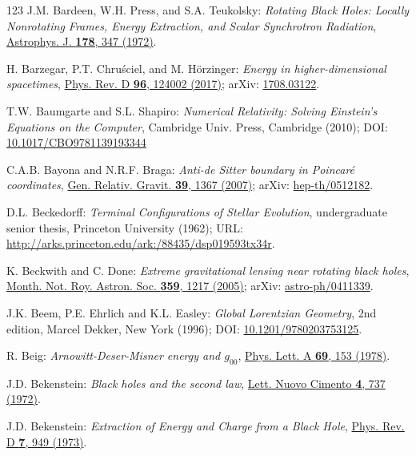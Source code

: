 \begin{thebibliography}{123}
J.M. Bardeen, W.H. Press, and S.A. Teukolsky:
{\em Rotating Black Holes: Locally Nonrotating Frames, Energy Extraction, and Scalar Synchrotron Radiation},
\href{https://doi.org/10.1086/151796}{Astrophys. J. {\bf  178}, 347 (1972)}.

H. Barzegar, P.T. Chruściel, and M. Hörzinger:
{\em Energy in higher-dimensional spacetimes},
\href{https://doi.org/10.1103/PhysRevD.96.124002}{Phys. Rev. D {\bf 96}, 124002 (2017)};
arXiv: \href{https://arxiv.org/abs/1708.03122}{1708.03122}.

T.W. Baumgarte and S.L. Shapiro:
{\em Numerical Relativity: Solving Einstein's Equations on the Computer},
Cambridge Univ. Press, Cambridge (2010);
DOI: \href{https://doi.org/10.1017/CBO9781139193344}{10.1017/CBO9781139193344}

C.A.B. Bayona and N.R.F. Braga:
{\em Anti-de Sitter boundary in Poincaré coordinates},
\href{https://doi.org/10.1007/s10714-007-0446-y}{Gen. Relativ. Gravit. {\bf 39}, 1367 (2007)};
arXiv: \href{https://arxiv.org/abs/hep-th/0512182}{hep-th/0512182}.

D.L. Beckedorff:
{\em Terminal Configurations of Stellar Evolution},
undergraduate senior thesis, Princeton University (1962);
URL: \url{http://arks.princeton.edu/ark:/88435/dsp019593tx34r}.

K. Beckwith and C. Done:
{\em Extreme gravitational lensing near rotating black holes},
\href{https://doi.org/10.1111/j.1365-2966.2005.08980.x}{Month. Not. Roy. Astron. Soc. {\bf 359}, 1217 (2005)};
arXiv: \href{https://arxiv.org/abs/astro-ph/0411339}{astro-ph/0411339}.

J.K. Beem, P.E. Ehrlich and K.L. Easley:
{\em Global Lorentzian Geometry}, 2nd edition,
Marcel Dekker, New York (1996);
DOI: \href{https://doi.org/10.1201/9780203753125}{10.1201/9780203753125}.

R. Beig:
{\em Arnowitt-Deser-Misner energy and $g_{00}$},
\href{https://doi.org/10.1016/0375-9601(78)90198-6}{Phys. Lett. A {\bf 69}, 153 (1978)}.

J.D. Bekenstein:
{\em Black holes and the second law},
\href{https://doi.org/10.1007/BF02757029}{Lett. Nuovo Cimento {\bf 4}, 737 (1972)}.

J.D. Bekenstein:
{\em Extraction of Energy and Charge from a Black Hole},
\href{https://doi.org/10.1103/PhysRevD.7.949}{Phys. Rev. D {\bf 7}, 949 (1973)}.


\end{thebibliography}
